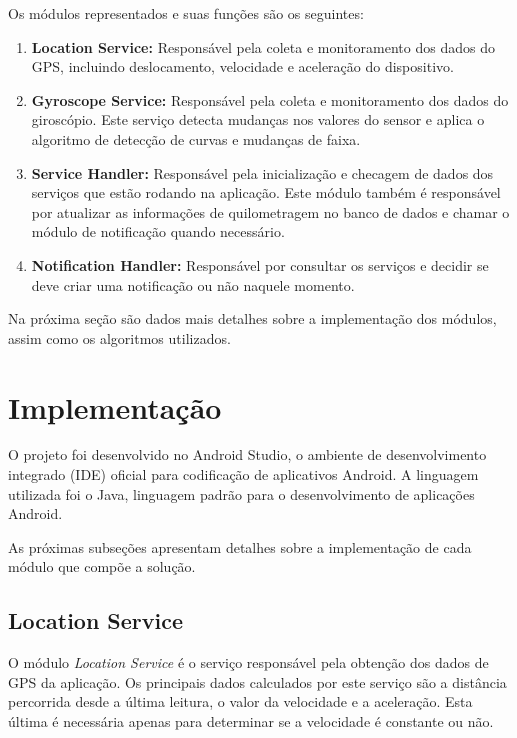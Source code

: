 Os módulos representados e suas funções são os seguintes:

\begin{enumerate}
  \item \textbf{Location Service:} Responsável pela coleta e monitoramento dos dados do GPS, incluindo deslocamento, velocidade e
  aceleração do dispositivo.
  \item \textbf{Gyroscope Service:} Responsável pela coleta e monitoramento dos dados do giroscópio. Este serviço detecta mudanças
  nos valores do sensor e aplica o algoritmo de detecção de curvas e mudanças de faixa.
  \item \textbf{Service Handler:} Responsável pela inicialização e checagem de dados dos serviços
  que estão rodando na aplicação. Este módulo também é responsável por atualizar as informações
  de quilometragem no banco de dados e chamar o módulo de notificação quando necessário.
  \item \textbf{Notification Handler:} Responsável por consultar os serviços e decidir se deve criar uma notificação ou não naquele
  momento.
\end{enumerate}

Na próxima seção são dados mais detalhes sobre a implementação dos módulos, assim como os algoritmos utilizados.

\section{Implementação}
\label{sec-implementacao}

O projeto foi desenvolvido no Android Studio, o ambiente de desenvolvimento integrado (IDE) oficial para
codificação de aplicativos Android. A linguagem utilizada foi o Java, linguagem padrão para o desenvolvimento
de aplicações Android.

As próximas subseções apresentam detalhes sobre a implementação de cada módulo que compõe a solução.

\subsection{Location Service}
\label{location-service}

O módulo \textit{Location Service} é o serviço responsável pela obtenção dos dados de GPS da aplicação. Os principais dados calculados
por este serviço são a distância percorrida desde a última leitura, o valor da velocidade e a aceleração. Esta última é necessária
apenas para determinar se a velocidade é constante ou não.

